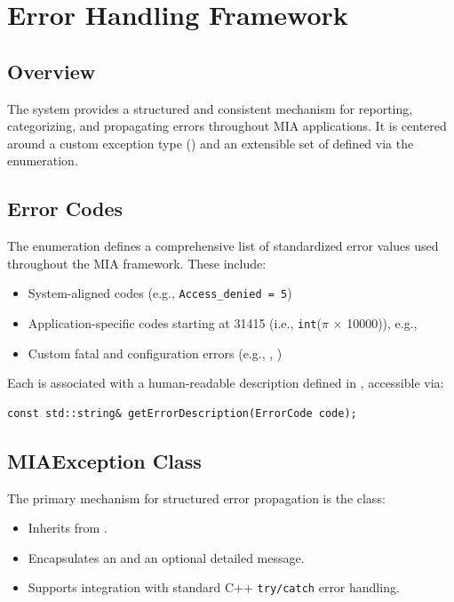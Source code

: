 \section{Error Handling Framework}\label{section:error_handling}

\subsection{Overview}
The   system provides a structured and consistent mechanism for reporting, categorizing, and propagating errors throughout MIA applications. It is centered around a custom exception type () and an extensible set of  defined via the  enumeration.

\subsection{Error Codes}
The  enumeration defines a comprehensive list of standardized error values used throughout the MIA framework. These include:
\begin{itemize}\itemsep0em
	\item System-aligned codes (e.g., \texttt{Access\_denied = 5})
	\item Application-specific codes starting at 31415 (i.e., \texttt{int}($\pi$ × 10000)), e.g., 
	\item Custom fatal and configuration errors (e.g., , )
\end{itemize}

Each  is associated with a human-readable description defined in , accessible via:
\begin{lstlisting}[style=cppstyle]
const std::string& getErrorDescription(ErrorCode code);
\end{lstlisting}

\subsection{MIAException Class}
The primary mechanism for structured error propagation is the  class:
\begin{itemize}\itemsep0em
	\item Inherits from .
	\item Encapsulates an  and an optional detailed message.
	\item Supports integration with standard C++ \texttt{try/catch} error handling.
\end{itemize}

